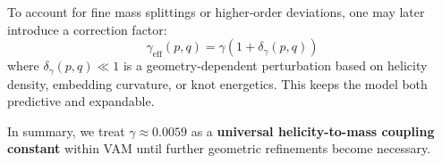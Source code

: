 \documentclass[11pt]{article}
\begin{document}
    To account for fine mass splittings or higher-order deviations, one may later introduce a correction factor:
    \[
        \gamma_{\text{eff}}(p,q) = \gamma \left( 1 + \delta_\gamma(p,q) \right)
    \]
    where \( \delta_\gamma(p,q) \ll 1 \) is a geometry-dependent perturbation based on helicity density, embedding curvature, or knot energetics. This keeps the model both predictive and expandable.

    In summary, we treat \( \gamma \approx 0.0059 \) as a \textbf{universal helicity-to-mass coupling constant} within VAM until further geometric refinements become necessary.
\end{document}
